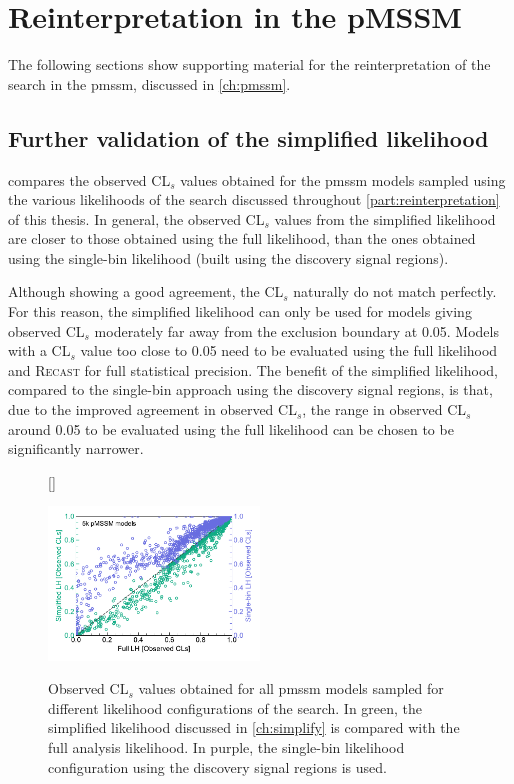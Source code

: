 
\chapter{Reinterpretation in the pMSSM}

\graphicspath{{chapter-pmssm/Figs/Vector/}{chapter-pmssm/Figs/}}

The following sections show supporting material for the reinterpretation of the \onelepton search in the \gls{pmssm}, discussed in \cref{ch:pmssm}.


\section{Further validation of the simplified likelihood}

 compares the observed CL$_s$ values obtained for the \gls{pmssm} models sampled using the various likelihoods of the \onelepton search  discussed throughout \cref{part:reinterpretation} of this thesis. In general, the observed CL$_s$ values from the simplified likelihood are closer to those obtained using the full likelihood, than the ones obtained using the single-bin likelihood (built using the discovery signal regions).

Although showing a good agreement, the CL$_s$ naturally do not match perfectly. For this reason, the simplified likelihood can only be used for models giving observed CL$_s$ moderately far away from the exclusion boundary at 0.05. Models with a CL$_s$ value too close to 0.05 need to be evaluated using the full likelihood and \textsc{Recast} for full statistical precision. The benefit of the simplified likelihood, compared to the single-bin approach using the discovery signal regions, is that, due to the improved agreement in observed CL$_s$, the range in observed CL$_s$ around 0.05 to be evaluated using the full likelihood can be chosen to be significantly narrower.
\begin{figure}[H]
[\FBwidth]
{\caption{Observed CL$_s$ values obtained for all \gls{pmssm} models sampled for different likelihood configurations of the \onelepton search. In green, the simplified likelihood discussed in \cref{ch:simplify} is compared with the full analysis likelihood. In purple, the single-bin likelihood configuration using the discovery signal regions is used.}\label{fig:validation_simplified_full_likelihood}}
{\includegraphics[width=0.5\textwidth]{fig_scatter_likelihoods}}
\end{figure}

